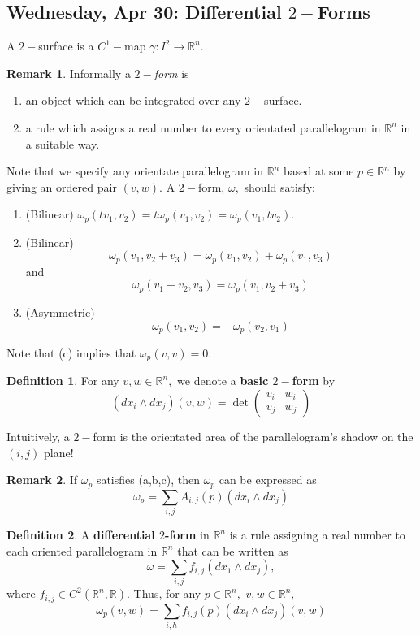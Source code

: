 \documentclass[10pt, oneside]{article}
\newcommand{\bbR}{\mathbb{R}}
\theoremstyle{definition}
\newtheorem{defn}{Definition}
\newtheorem{rem}{Remark}
\begin{document}
\subsection{Wednesday, Apr 30: Differential $2-$Forms}
A $2-$surface is a $C^1-$map $\gamma: I^2 \to \bbR^n.$
\begin{rem}
    Informally a \textit{$2-$form} is
    \begin{enumerate}
        \item an object which can be integrated over any $2-$surface.
        \item a rule which assigns a real number to every orientated parallelogram in $\bbR^n$ in a suitable way. 
    \end{enumerate}
Note that we specify any orientate parallelogram in $\bbR^n$ based at some $p \in \bbR^n$ by giving an ordered pair $(v,w).$ A $2-$form, $\omega,$ should satisfy:
\begin{enumerate}
    \item (Bilinear) $\omega_p(tv_1, v_2) = t\omega_p(v_1, v_2) = \omega_p(v_1, tv_2).$
    \item (Bilinear) \[\omega_p(v_1, v_2 + v_3) = \omega_p(v_1, v_2) + \omega_p(v_1, v_3)\] and 
    \[\omega_p(v_1 + v_2, v_3) = \omega_p(v_1, v_2 + v_3)\]
    \item (Asymmetric)
    \[\omega_p(v_1, v_2) = -\omega_p(v_2, v_1)\]
\end{enumerate}
Note that (c) implies that $\omega_p(v,v) = 0.$
\end{rem}
\begin{defn}
    For any $v,w \in \bbR^n,$ we denote a \textbf{basic $2-$form} by 
    \[(dx_i \wedge dx_j)(v, w) = \det\begin{pmatrix}
        v_i & w_i\\
        v_j & w_j
    \end{pmatrix}\]
\end{defn}
Intuitively, a $2-$form is the orientated area of the parallelogram's shadow on the $(i,j)$ plane!
\begin{rem}
    If $\omega_p$ satisfies (a,b,c), then $\omega_p$ can be expressed as 
    \[\omega_p = \sum_{i,j}A_{i,j}(p)(dx_i \wedge dx_j)\]
\end{rem}

\begin{defn}
    A \textbf{differential $2$-form} in $\bbR^n$ is a rule assigning a real number to each oriented parallelogram in $\bbR^n$ that can be written as 
    \[\omega = \sum_{i,j}f_{i,j}(dx_1\wedge dx_j),\] where $f_{i,j} \in C^2(\bbR^n, \bbR).$ Thus, for any $p \in \bbR^n,$ $v,w \in \bbR^n,$
    \[\omega_p(v,w) = \sum_{i,h}f_{i,j}(p)(dx_i \wedge dx_j)(v,w)\]
\end{defn}
\end{document}
